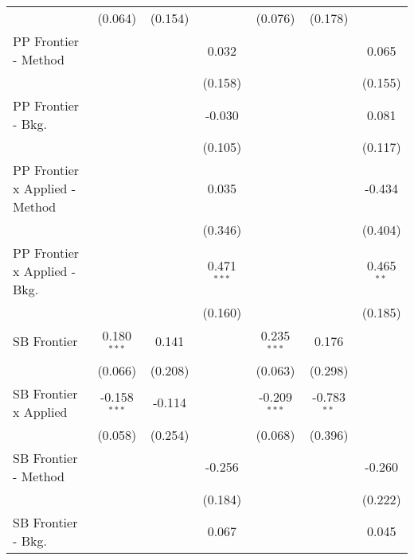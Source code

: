 \begin{tabular}{lcccccc}
                                  & (0.064)        & (0.154)       &               & (0.076)        & (0.178)       &   \\   
   PP Frontier - Method           &                &               & 0.032         &                &               & 0.065\\   
                                  &                &               & (0.158)       &                &               & (0.155)\\   
   PP Frontier - Bkg.             &                &               & -0.030        &                &               & 0.081\\   
                                  &                &               & (0.105)       &                &               & (0.117)\\   
   PP Frontier x Applied - Method &                &               & 0.035         &                &               & -0.434\\   
                                  &                &               & (0.346)       &                &               & (0.404)\\   
   PP Frontier x Applied - Bkg.   &                &               & 0.471$^{***}$ &                &               & 0.465$^{**}$\\   
                                  &                &               & (0.160)       &                &               & (0.185)\\   
   SB Frontier                    & 0.180$^{***}$  & 0.141         &               & 0.235$^{***}$  & 0.176         &   \\   
                                  & (0.066)        & (0.208)       &               & (0.063)        & (0.298)       &   \\   
   SB Frontier x Applied          & -0.158$^{***}$ & -0.114        &               & -0.209$^{***}$ & -0.783$^{**}$ &   \\   
                                  & (0.058)        & (0.254)       &               & (0.068)        & (0.396)       &   \\   
   SB Frontier - Method           &                &               & -0.256        &                &               & -0.260\\   
                                  &                &               & (0.184)       &                &               & (0.222)\\   
   SB Frontier - Bkg.             &                &               & 0.067         &                &               & 0.045\\   

\end{tabular}

